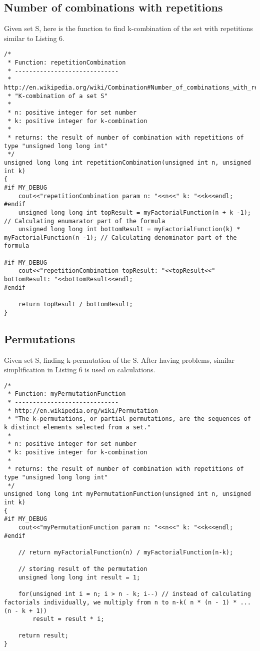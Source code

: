 \documentclass{article}
\begin{document}
	\subsection{Number of combinations with repetitions}
	Given set S, here is the function to find k-combination of the set with repetitions similar to Listing 6.
		\begin{lstlisting}[label=combination-with-repetitions,caption=Combination w/Repetitions]	
/*
 * Function: repetitionCombination
 * -----------------------------
 * http://en.wikipedia.org/wiki/Combination#Number_of_combinations_with_repetition
 * "K-combination of a set S"
 *
 * n: positive integer for set number
 * k: positive integer for k-combination
 *
 * returns: the result of number of combination with repetitions of type "unsigned long long int"
 */
unsigned long long int repetitionCombination(unsigned int n, unsigned int k)
{
#if MY_DEBUG
    cout<<"repetitionCombination param n: "<<n<<" k: "<<k<<endl;
#endif
    unsigned long long int topResult = myFactorialFunction(n + k -1); // Calculating enumarator part of the formula
    unsigned long long int bottomResult = myFactorialFunction(k) * myFactorialFunction(n -1); // Calculating denominator part of the formula
    
#if MY_DEBUG
    cout<<"repetitionCombination topResult: "<<topResult<<" bottomResult: "<<bottomResult<<endl;
#endif
    
    return topResult / bottomResult;
}
		\end{lstlisting}


	\subsection{Permutations}
	Given set S, finding k-permutation of the S. After having problems, similar simplification in Listing 6 is used on calculations.
		\begin{lstlisting}[label=permutations,caption=Permutations]	
/*
 * Function: myPermutationFunction
 * -----------------------------
 * http://en.wikipedia.org/wiki/Permutation
 * "The k-permutations, or partial permutations, are the sequences of k distinct elements selected from a set."
 *
 * n: positive integer for set number
 * k: positive integer for k-combination
 *
 * returns: the result of number of combination with repetitions of type "unsigned long long int"
 */
unsigned long long int myPermutationFunction(unsigned int n, unsigned int k)
{
#if MY_DEBUG
    cout<<"myPermutationFunction param n: "<<n<<" k: "<<k<<endl;
#endif
    
    // return myFactorialFunction(n) / myFactorialFunction(n-k);
    
    // storing result of the permutation
    unsigned long long int result = 1;
    
    for(unsigned int i = n; i > n - k; i--) // instead of calculating factorials individually, we multiply from n to n-k( n * (n - 1) * ... (n - k + 1))
        result = result * i;
    
    return result;
}
		\end{lstlisting}
\end{document}
